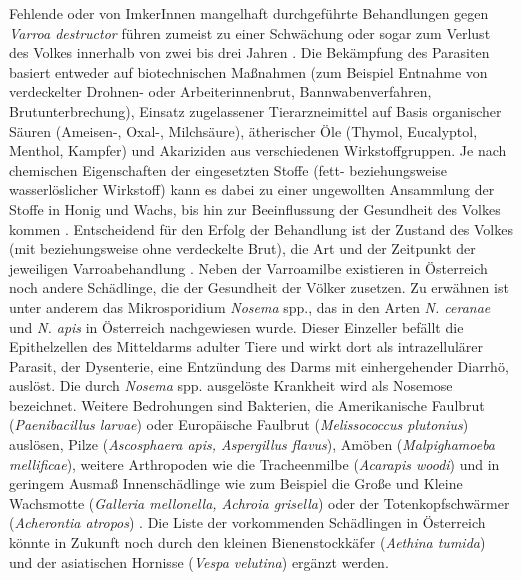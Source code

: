 Fehlende oder von ImkerInnen mangelhaft durchgeführte Behandlungen gegen \textit{Varroa destructor} führen zumeist zu einer Schwächung oder sogar zum Verlust des Volkes innerhalb von zwei bis drei Jahren \citep{rosenkranz2010}. Die Bekämpfung des Parasiten basiert entweder auf biotechnischen Maßnahmen (zum Beispiel Entnahme von verdeckelter Drohnen- oder Arbeiterinnenbrut, Bannwabenverfahren, Brutunterbrechung), Einsatz zugelassener Tierarzneimittel auf Basis organischer Säuren (Ameisen-, Oxal-, Milchsäure), ätherischer Öle (Thymol, Eucalyptol, Menthol, Kampfer) und Akariziden aus verschiedenen Wirkstoffgruppen. Je nach chemischen Eigenschaften der eingesetzten Stoffe (fett- beziehungsweise wasserlöslicher Wirkstoff) kann es dabei zu einer ungewollten Ansammlung der Stoffe in Honig und Wachs, bis hin zur Beeinflussung der Gesundheit des Volkes kommen \citep{rosenkranz2010, noel2020}. Entscheidend für den Erfolg der Behandlung ist der Zustand des Volkes (mit beziehungsweise ohne verdeckelte Brut), die Art und der Zeitpunkt der jeweiligen Varroabehandlung \citep{brodschneider2013, vanderzee2014}.
\newline
Neben der Varroamilbe existieren in Österreich noch andere Schädlinge, die der Gesundheit der Völker zusetzen. Zu erwähnen ist unter anderem das Mikrosporidium \textit{Nosema} spp., das in den Arten \textit{N. ceranae} und \textit{N. apis} in Österreich nachgewiesen wurde. Dieser Einzeller befällt die Epithelzellen des Mitteldarms adulter Tiere und wirkt dort als intrazellulärer Parasit, der Dysenterie, eine Entzündung des Darms mit einhergehender Diarrhö, auslöst. Die durch \textit{Nosema} spp. ausgelöste Krankheit wird als Nosemose bezeichnet. Weitere Bedrohungen sind Bakterien, die Amerikanische Faulbrut (\textit{Paenibacillus larvae}) oder Europäische Faulbrut (\textit{Melissococcus plutonius}) auslösen, Pilze (\textit{Ascosphaera apis, Aspergillus flavus}), Amöben (\textit{Malpighamoeba mellificae}), weitere Arthropoden wie die Tracheenmilbe (\textit{Acarapis woodi}) und in geringem Ausmaß Innenschädlinge wie zum Beispiel die Große und Kleine Wachsmotte (\textit{Galleria mellonella, Achroia grisella}) oder der Totenkopfschwärmer (\textit{Acherontia atropos}) \citep{brodschneider2011}. Die Liste der vorkommenden Schädlingen in Österreich könnte in Zukunft noch durch den kleinen Bienenstockkäfer (\textit{Aethina tumida}) \citep{neumann2016} und der asiatischen Hornisse (\textit{Vespa velutina}) \citep{monceau2014} ergänzt werden.
\newline
